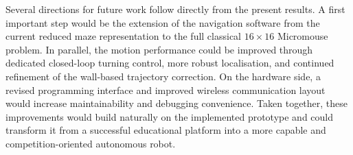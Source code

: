 Several directions for future work follow directly from the present results. A first important step would be the extension of the navigation software from the current reduced maze representation to the full classical $16 \times 16$ Micromouse problem. In parallel, the motion performance could be improved through dedicated closed-loop turning control, more robust localisation, and continued refinement of the wall-based trajectory correction. On the hardware side, a revised programming interface and improved wireless communication layout would increase maintainability and debugging convenience. Taken together, these improvements would build naturally on the implemented prototype and could transform it from a successful educational platform into a more capable and competition-oriented autonomous robot.
